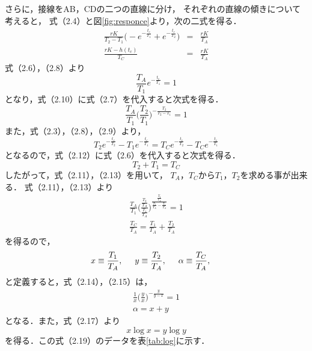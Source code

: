 \documentclass[11pt,a4paper]{jsarticle}
\begin{document}
  さらに，接線をAB，CDの二つの直線に分け，
  それぞれの直線の傾きについて考えると，
  式（2.4）と図\ref{fig:responce}より，次の二式を得る．
  \begin{eqnarray}
    \frac{r K}{T_2 - T_1} \biggl( - e^{- \frac{t_c}{T_1}} + e^{- \frac{t_c}{T_2}} \biggr) &=& \frac{r K}{T_A} \\
    \frac{r K - h(t_c)}{T_C} &=& \frac{r K}{T_A}
  \end{eqnarray}
  式（2.6），（2.8）より
  \begin{equation}
    \frac{T_A}{T_1} e^{- \frac{t_c}{T_1}} = 1
  \end{equation}
  となり，式（2.10）に式（2.7）を代入すると次式を得る．
  \begin{equation}
    \frac{T_A}{T_1} \biggl( \frac{T_2}{T_1} \biggr) ^{- \frac{T_2}{T_2 - T_1}} = 1
  \end{equation}
  また，式（2.3），（2.8），（2.9）より，
  \begin{equation}
    T_2 e^{- \frac{t_c}{T_2}} - T_1 e^{- \frac{t_c}{T_1}} = T_C e^{- \frac{t_c}{T_2}} - T_C e^{- \frac{t_c}{T_1}}
  \end{equation}
  となるので，式（2.12）に式（2.6）を代入すると次式を得る．
  \begin{equation}
    T_2 + T_1 = T_C
  \end{equation}
  したがって，式（2.11），（2.13）を用いて，
  $T_A$，$T_C$から$T_1$，$T_2$を求める事が出来る．
  式（2.11），（2.13）より
  \begin{eqnarray}
    \frac{T_A}{T_1} \biggl( \frac{\frac{T_2}{T_A}}{\frac{T_1}{T_A}} \biggr) ^{\frac{\frac{T_2}{T_A}}{\frac{T_2}{T_A} - \frac{T_1}{T_A}}} = 1 \\
    \frac{T_C}{T_A} = \frac{T_1}{T_A} + \frac{T_2}{T_A}
  \end{eqnarray}
  を得るので，
  \begin{equation}
    x \equiv \frac{T_1}{T_A}, \hspace{5mm}
    y \equiv \frac{T_2}{T_A}, \hspace{5mm}
    \alpha \equiv \frac{T_C}{T_A}, \hspace{5mm}
  \end{equation}
  と定義すると，式（2.14），（2.15）は，
  \begin{eqnarray}
    \frac{1}{x} \biggl( \frac{y}{x} \biggr) ^{- \frac{y}{y - x}} = 1 \\
    \alpha = x + y
  \end{eqnarray}
  となる．また，式（2.17）より
  \begin{equation}
    x \log{x} = y \log{y}
  \end{equation}
  を得る．この式（2.19）のデータを表\ref{tab:log}に示す．
\end{document}

